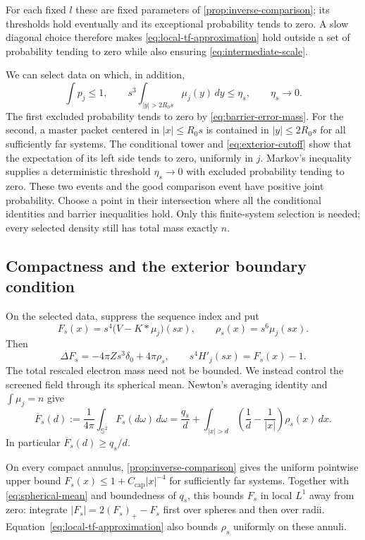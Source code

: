For each fixed $l$ these are fixed parameters of
\cref{prop:inverse-comparison}; its thresholds hold eventually and
its exceptional probability tends to zero.  A slow diagonal choice
therefore makes \cref{eq:local-tf-approximation} hold outside a set
of probability tending to zero while also ensuring
\cref{eq:intermediate-scale}.

We can select data on which, in addition,
\begin{equation}\label{eq:selected-data}
 \int p_j\le1,
 \qquad
 s^3\int_{|y|>2R_0s}\mu_j(y)\,dy\le\eta_s,
 \qquad\eta_s\longrightarrow0.
\end{equation}
The first excluded probability tends to zero by
\cref{eq:barrier-error-mass}.  For the second, a master packet
centered in $|x|\le R_0s$ is contained in $|y|\le2R_0s$ for all
sufficiently far systems.  The conditional tower and
\cref{eq:exterior-cutoff} show that the expectation of its left side
tends to zero, uniformly in $j$.  Markov's inequality supplies a
deterministic threshold $\eta_s\to0$ with excluded probability
tending to zero.  These two events and the good comparison event
have positive joint probability.  Choose a point in their intersection
where all the conditional identities and barrier inequalities hold.
Only this finite-system selection is needed; every selected density
still has total mass exactly $n$.

\subsection{Compactness and the exterior boundary condition}

On the selected data, suppress the sequence index and put
\[
 F_s(x)=s^4\bigl(V-K*\mu_j\bigr)(sx),
 \qquad \rho_s(x)=s^6\mu_j(sx).
\]
Then
\[
 \Delta F_s=-4\pi Zs^3\delta_0+4\pi\rho_s,
 \qquad s^4H'_j(sx)=F_s(x)-1.
\]
The total rescaled electron mass need not be bounded.  We instead
control the screened field through its spherical mean.  Newton's
averaging identity and $\int\mu_j=n$ give
\begin{equation}\label{eq:spherical-mean}
 \overline F_s(d):=\frac1{4\pi}\int_{\mathbb S^2}F_s(d\omega)\,d\omega
 =\frac{q_s}{d}
   +\int_{|x|>d}\left(\frac1d-\frac1{|x|}\right)\rho_s(x)\,dx.
\end{equation}
In particular $\overline F_s(d)\ge q_s/d$.

On every compact annulus, \cref{prop:inverse-comparison} gives the
uniform pointwise upper bound
$F_s(x)\le1+C_{\mathrm{cap}}|x|^{-4}$ for sufficiently far systems.
Together with \cref{eq:spherical-mean} and boundedness of $q_s$, this
bounds $F_s$ in local $L^1$ away from zero: integrate
$|F_s|=2(F_s)_+-F_s$ first over spheres and then over radii.
Equation~\eqref{eq:local-tf-approximation} also bounds $\rho_s$
uniformly on these annuli.

